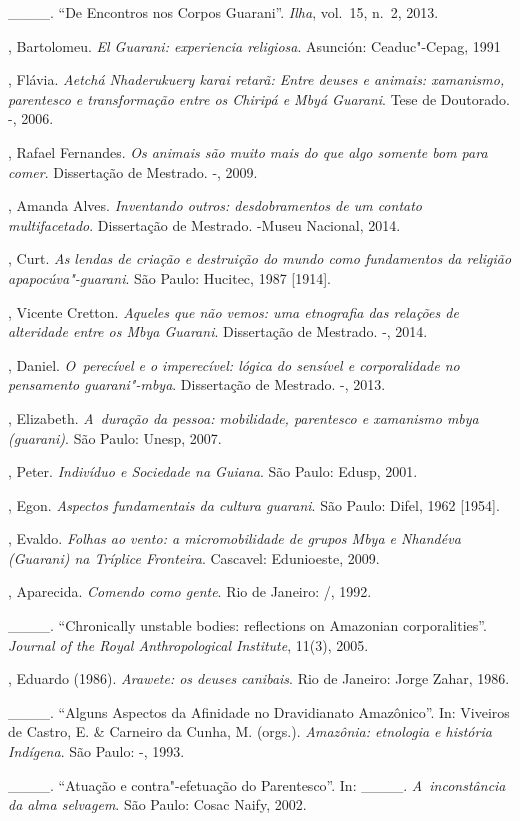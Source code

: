\begin{Parskip}
\_\_\_\_. ``De Encontros nos Corpos Guarani''. \emph{Ilha}, vol.~15, n.~2, 2013.

, Bartolomeu. \emph{El Guarani: experiencia religiosa}. Asunción:
Ceaduc"-Cepag, 1991

, Flávia. \emph{Aetchá Nhaderukuery karai retarã: Entre
deuses e animais: xamanismo, parentesco e transformação entre os
Chiripá e Mbyá Guarani}. Tese de Doutorado. -,
2006.

 , Rafael Fernandes. \emph{Os animais são muito mais do que algo
somente bom para comer}. Dissertação de Mestrado. -,
2009.

, Amanda Alves. \emph{Inventando outros: desdobramentos de um contato
multifacetado}. Dissertação de Mestrado. -Museu
Nacional, 2014.

, Curt. \emph{As lendas de criação e destruição do mundo como
fundamentos da religião apapocúva"-guarani}. São Paulo: Hucitec, 1987
[1914].

, Vicente Cretton. \emph{Aqueles que não vemos: uma etnografia das
relações de alteridade entre os Mbya Guarani}. Dissertação de Mestrado.
-, 2014.

, Daniel. \emph{O~perecível e o imperecível: lógica do sensível
e corporalidade no pensamento guarani"-mbya}. Dissertação de Mestrado.
-, 2013.

, Elizabeth. \emph{A~duração da pessoa: mobilidade, parentesco e
xamanismo mbya (guarani)}. São Paulo: Unesp, 2007.

, Peter. \emph{Indivíduo e Sociedade na Guiana}. São Paulo: Edusp, 2001.

, Egon. \emph{Aspectos fundamentais da cultura guarani}. São Paulo:
Difel, 1962 [1954]. 

, Evaldo. \emph{Folhas ao vento: a micromobilidade de grupos
Mbya e Nhandéva (Guarani) na Tríplice Fronteira}. Cascavel: Edunioeste,
2009.

, Aparecida. \emph{Comendo como gente}. Rio de Janeiro: /,
1992.

\_\_\_\_. ``Chronically unstable bodies: reflections on Amazonian
corporalities''. \emph{Journal of the Royal Anthropological Institute}, 11(3),
2005.

, Eduardo (1986). \emph{Arawete: os deuses canibais}. Rio de
Janeiro: Jorge Zahar, 1986.

\_\_\_\_. ``Alguns Aspectos da Afinidade no Dravidianato Amazônico''. In:
Viveiros de Castro, E. \& Carneiro da Cunha, M. (orgs.).
\emph{Amazônia: etnologia e história Indígena}. São Paulo: -,
1993.

\_\_\_\_. ``Atuação e contra"-efetuação do Parentesco''. In: \_\_\_\_. \emph{A~inconstância da
alma selvagem}. São Paulo: Cosac Naify, 2002.
\end{Parskip}

